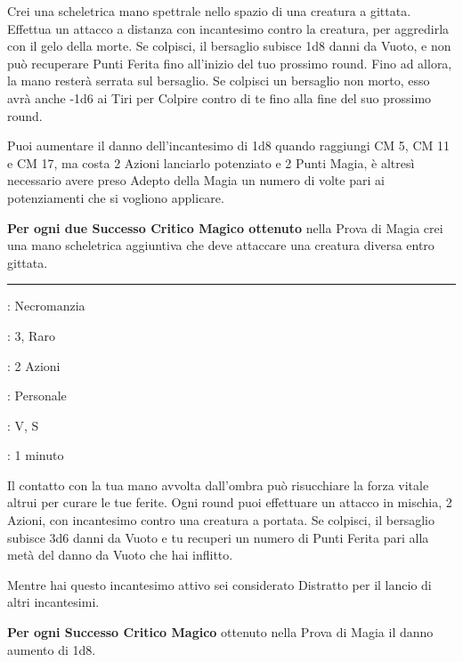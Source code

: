 \begin{multicols}{2}
Crei una scheletrica mano spettrale nello spazio di una creatura a gittata. Effettua un attacco a distanza con incantesimo contro la creatura, per aggredirla con il gelo della morte. Se colpisci, il bersaglio subisce 1d8 danni da Vuoto, e non può recuperare Punti Ferita fino all'inizio del tuo prossimo round. Fino ad allora, la mano resterà serrata sul bersaglio. Se colpisci un bersaglio non morto, esso avrà anche -1d6 ai Tiri per Colpire contro di te fino alla fine del suo prossimo round.

Puoi aumentare il danno dell'incantesimo di 1d8 quando raggiungi CM 5, CM 11 e CM 17, ma costa 2 Azioni lanciarlo potenziato e 2 Punti Magia, è altresì necessario avere preso Adepto della Magia un numero di volte pari ai potenziamenti che si vogliono applicare.

\textbf{Per ogni due Successo Critico Magico ottenuto} nella Prova di Magia crei una mano scheletrica aggiuntiva che deve attaccare una creatura diversa entro gittata.

\smallskip\noindent\rule{\linewidth}{2pt} \hypertarget{Tocco Vampirico}{}\medskip{}
\noindent
\begin{description}[noitemsep, topsep=0pt, parsep=0pt, partopsep=0pt, leftmargin=0cm, labelwidth=2.8cm]
	\item[\textbf{Lista di Magia}]: Necromanzia
	\item[\textbf{Livello}]: 3, Raro
	\item[\textbf{T. di Lancio}]: 2 Azioni
	\item[\textbf{Gittata}]: Personale
	\item[\textbf{Componenti}]: V, S
	\item[\textbf{Durata}]: 1 minuto
\end{description}

Il contatto con la tua mano avvolta dall'ombra può risucchiare la forza vitale altrui per curare le tue ferite. Ogni round puoi effettuare un attacco in mischia, 2 Azioni, con incantesimo contro una creatura a portata. Se colpisci, il bersaglio subisce 3d6 danni da Vuoto e tu recuperi un numero di Punti Ferita pari alla metà del danno da Vuoto che hai inflitto.

Mentre hai questo incantesimo attivo sei considerato Distratto per il lancio di altri incantesimi.

\textbf{Per ogni Successo Critico Magico} ottenuto nella Prova di Magia il danno aumento di 1d8.


\end{multicols}
